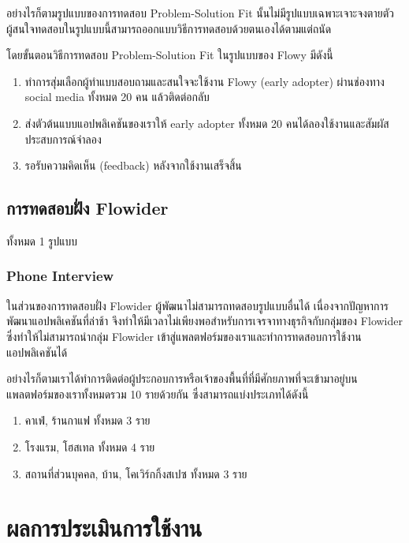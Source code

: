 อย่างไรก็ตามรูปแบบของการทดสอบ Problem-Solution Fit นั้นไม่มีรูปแบบเฉพาะเจาะจงตายตัว ผู้สนใจทดสอบในรูปแบบนี้สามารถออกแบบวิธีการทดสอบด้วยตนเองได้ตามแต่ถนัด

โดยขั้นตอนวิธีการทดสอบ Problem-Solution Fit ในรูปแบบของ Flowy มีดังนี้
\begin{enumerate}
    \item ทำการสุ่มเลือกผู้ทำแบบสอบถามและสนใจจะใช้งาน Flowy (early adopter) ผ่านช่องทาง social media ทั้งหมด 20 คน แล้วติดต่อกลับ
    \item ส่งตัวต้นแบบแอปพลิเคชันของเราให้ early adopter ทั้งหมด 20 คนได้ลองใช้งานและสัมผัสประสบการณ์จำลอง
    \item รอรับความคิดเห็น (feedback) หลังจากใช้งานเสร็จสิ้น
\end{enumerate}

\subsection{การทดสอบฝั่ง Flowider}
ทั้งหมด 1 รูปแบบ
\subsubsection{Phone Interview}
ในส่วนของการทดสอบฝั่ง Flowider ผู้พัฒนาไม่สามารถทดสอบรูปแบบอื่นได้ เนื่องจากปัญหาการพัฒนาแอปพลิเคชันที่ล่าช้า จึงทำให้มีเวลาไม่เพียงพอสำหรับการเจรจาทางธุรกิจกับกลุ่มของ Flowider ซึ่งทำให้ไม่สามารถนำกลุ่ม Flowider เข้าสู่แพลตฟอร์มของเราและทำการทดสอบการใช้งานแอปพลิเคชันได้

อย่างไรก็ตามเราได้ทำการติดต่อผู้ประกอบการหรือเจ้าของพื้นที่ที่มีศักยภาพที่จะเข้ามาอยู่บนแพลตฟอร์มของเราทั้งหมดรวม 10 รายด้วยกัน ซึ่งสามารถแบ่งประเภทได้ดังนี้
\begin{enumerate}
    \item คาเฟ่, ร้านกาแฟ ทั้งหมด 3 ราย
    \item โรงแรม, โฮสเทล ทั้งหมด 4 ราย
    \item สถานที่ส่วนบุคคล, บ้าน, โคเวิร์กกิ้งสเปซ ทั้งหมด 3 ราย
\end{enumerate}

\section{ผลการประเมินการใช้งาน}
